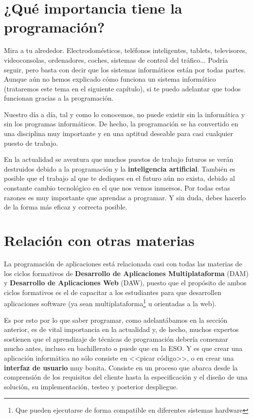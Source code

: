 \section{¿Qué importancia tiene la programación?}

Mira a tu alrededor. Electrodomésticos, teléfonos inteligentes, tablets, televisores, videoconsolas, ordenadores, coches,
sistemas de control del tráfico... Podría seguir, pero basta con decir que los sistemas informáticos están 
por todas partes. Aunque aún no hemos explicado cómo funciona un sistema informático (trataremos este tema en el siguiente 
capítulo), si te puedo adelantar que todos funcionan gracias a la programación. 

Nuestro día a día, tal y como lo conocemos, no puede existir sin la informática y sin los programas
informáticos. De hecho, la programación se ha convertido en una disciplina muy importante y en una aptitud deseable
para casi cualquier puesto de trabajo. 

En la actualidad se aventura que muchos puestos de trabajo futuros se verán destruidos debido a la programación 
y la \textbf{inteligencia artificial}. También es posible que el trabajo al que te dediques en el futuro aún no exista, 
debido al constante cambio tecnológico en el que nos vemos inmersos. Por todas estas razones es muy importante que aprendas 
a programar. Y sin duda, debes hacerlo de la forma más eficaz y correcta posible.

\section{Relación con otras materias}

La programación de aplicaciones está relacionada casi con todas las materias de los ciclos formativos de 
\textbf{Desarrollo de Aplicaciones Multiplataforma} (DAM) y \textbf{Desarrollo de Aplicaciones Web} (DAW), puesto que el 
propósito de ambos ciclos formativos es el de capacitar a los estudiantes para que desarrollen aplicaciones software
(ya sean multiplataforma\footnote{Que pueden ejecutarse de forma compatible en diferentes sistemas hardware} u orientadas a la web).

Es por esto por lo que saber programar, como adelantábamos en la sección anterior, es de vital importancia en la actualidad y,
de hecho, muchos expertos sostienen que el aprendizaje de técnicas de programación debería comenzar mucho antes, incluso en
bachillerato o puede que en la ESO. Y es que crear una aplicación informática no sólo consiste en <<picar código>>, o en crear una \textbf{interfaz de usuario} muy bonita.
Consiste en un proceso que abarca desde la comprensión de los requisitos del cliente hasta la especificación y el diseño de una 
solución, su implementación, testeo y posterior despliegue. 

